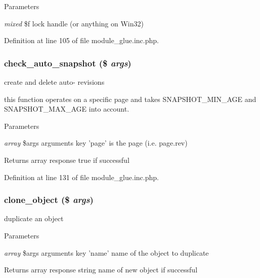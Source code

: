 \begin{DoxyParams}{Parameters}
\item[{\em mixed}]\$f lock handle (or anything on Win32) \end{DoxyParams}


Definition at line 105 of file module\_\-glue.inc.php.

\hypertarget{module__glue_8inc_8php_aaa1103a091b9dbca790e77d25a452ca5}{
\subsubsection[{check\_\-auto\_\-snapshot}]{\setlength{\rightskip}{0pt plus 5cm}check\_\-auto\_\-snapshot (\$ {\em args})}}
\label{module__glue_8inc_8php_aaa1103a091b9dbca790e77d25a452ca5}
create and delete auto-\/ revisions

this function operates on a specific page and takes SNAPSHOT\_\-MIN\_\-AGE and SNAPSHOT\_\-MAX\_\-AGE into account. 
\begin{DoxyParams}{Parameters}
\item[{\em array}]\$args arguments key 'page' is the page (i.e. page.rev) \end{DoxyParams}
\begin{DoxyReturn}{Returns}
array response true if successful 
\end{DoxyReturn}


Definition at line 131 of file module\_\-glue.inc.php.

\hypertarget{module__glue_8inc_8php_a9c7f39d87787ce288ce3d8a3e389ba95}{
\subsubsection[{clone\_\-object}]{\setlength{\rightskip}{0pt plus 5cm}clone\_\-object (\$ {\em args})}}
\label{module__glue_8inc_8php_a9c7f39d87787ce288ce3d8a3e389ba95}
duplicate an object


\begin{DoxyParams}{Parameters}
\item[{\em array}]\$args arguments key 'name' name of the object to duplicate \end{DoxyParams}
\begin{DoxyReturn}{Returns}
array response string name of new object if successful 
\end{DoxyReturn}


